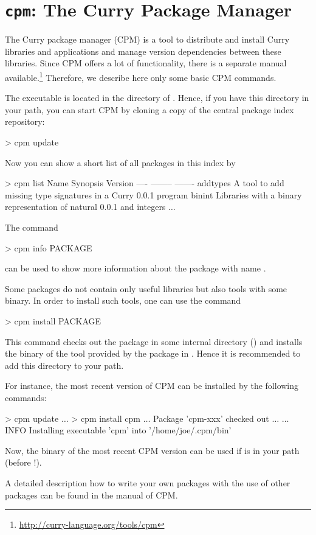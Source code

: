 \section{\texttt{cpm}: The Curry Package Manager}
\label{sec-cpm}

The Curry package manager (CPM) is a tool to
distribute and install Curry libraries and applications
and manage version dependencies between these libraries.
Since CPM offers a lot of functionality, there is a separate
manual available.\footnote{\url{http://curry-language.org/tools/cpm}}
Therefore, we describe here only some basic CPM commands.

The executable  is located in the  directory
of \CYS. Hence, if you have this directory in your path,
you can start CPM by cloning a copy of the central package index repository:
%
\begin{curry}
> cpm update
\end{curry}
%
Now you can show a short list of all packages in this index by
%
\begin{curry}
> cpm list
Name             Synopsis                                             Version   
----             --------                                             -------   
addtypes         A tool to add missing type signatures in a Curry     0.0.1     
                 program                                                        
binint           Libraries with a binary representation of natural    0.0.1     
                 and integers                                                   
$\ldots$
\end{curry}
%
The command
%
\begin{curry}
> cpm info PACKAGE
\end{curry}
%
can be used to show more information about the package with name
.

Some packages do not contain only useful libraries
but also tools with some binary. In order to install such tools,
one can use the command
%
\begin{curry}
> cpm install PACKAGE
\end{curry}
%
This command checks out the package in some internal directory
()
and installs the binary of the tool provided by the package
in .
Hence it is recommended to add this directory to your path.

For instance, the most recent version of CPM
can be installed by the following commands:
%
\begin{curry}
> cpm update
$\ldots$
> cpm install cpm
$\ldots$ Package 'cpm-xxx' checked out $\ldots$
$\ldots$
INFO  Installing executable 'cpm' into '/home/joe/.cpm/bin'
\end{curry}
%
Now, the binary  of the most recent CPM version can be used
if  is in your path
(before !).

A detailed description how to write your own packages
with the use of other packages can be found in the manual of CPM.

